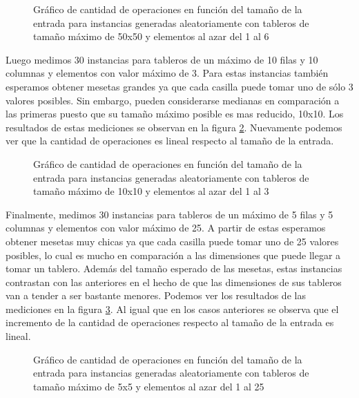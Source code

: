 \documentclass[10pt, a4paper,english,spanish]{article}
\begin{document}
\begin{figure}[H]
	 \begin{center}
	   \caption{Gráfico de cantidad de operaciones en función del tamaño de la entrada para instancias generadas 
	   aleatoriamente con tableros de tamaño máximo de 50x50 y elementos al azar del 1 al 6} 
	   \label{gr1}
	 \end{center}
\end{figure}


\indent Luego medimos 30 instancias para tableros de un máximo de 10 filas y 10 columnas y elementos con valor máximo de 3. 
Para estas instancias también esperamos obtener mesetas grandes ya que cada casilla puede tomar uno de sólo 3 valores posibles. 
Sin embargo, pueden considerarse medianas en comparación a las primeras puesto que su tamaño máximo posible es mas 
reducido, 10x10. Los resultados de estas mediciones se observan en la figura \ref{gr2}. 
Nuevamente podemos ver que la cantidad de operaciones es lineal respecto al tamaño de la entrada.

\begin{figure}[H]
	 \begin{center}
	   \caption{Gráfico de cantidad de operaciones en función del tamaño de la entrada para instancias generadas 
	   aleatoriamente con tableros de tamaño máximo de 10x10 y elementos al azar del 1 al 3} 
	   \label{gr2}
	 \end{center}
\end{figure}


\indent Finalmente, medimos 30 instancias para tableros de un máximo de 5 filas y 5 columnas y elementos con valor máximo de 25. 
A partir de estas esperamos obtener mesetas muy chicas ya que cada casilla puede tomar uno de 25 valores posibles, 
lo cual es mucho en comparación a las dimensiones que puede llegar a tomar un tablero. Además del tamaño esperado de las mesetas, 
estas instancias contrastan con las anteriores en el hecho de que las dimensiones de sus tableros van a tender a ser bastante menores. 
Podemos ver los resultados de las mediciones en la figura \ref{gr3}. Al igual que en los casos anteriores se observa que 
el incremento de la cantidad de operaciones respecto al tamaño de la entrada es lineal.

\begin{figure}[H]
	 \begin{center}
	   \caption{Gráfico de cantidad de operaciones en función del tamaño de la entrada para instancias generadas 
	   aleatoriamente con tableros de tamaño máximo de 5x5 y elementos al azar del 1 al 25} 
	   \label{gr3}
	 \end{center}
\end{figure}
\end{document}
